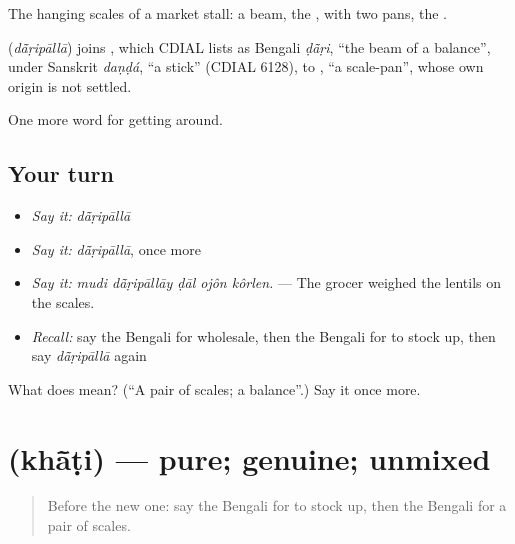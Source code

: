 The hanging scales of a market stall: a beam, the , with two pans, the .

\begin{cousinweb}
\textbf{} (\emph{dā̃ṛipāllā}) joins , which CDIAL lists as Bengali \emph{ḍā̃ṛi}, \textquotedblleft{}the beam of a balance\textquotedblright{}, under Sanskrit \emph{daṇḍá}, \textquotedblleft{}a stick\textquotedblright{} (CDIAL 6128), to , \textquotedblleft{}a scale-pan\textquotedblright{}, whose own origin is not settled.
\end{cousinweb}

\begin{grammarlens}[title={What you've built}]
One more word for getting around.
\end{grammarlens}

\subsection*{Your turn}
\begin{itemize}
\raggedright
  \item \emph{Say it:} \emph{dā̃ṛipāllā}
  \item \emph{Say it:} \emph{dā̃ṛipāllā}, once more
  \item \emph{Say it:} \emph{mudi dā̃ṛipāllāy ḍāl ojôn kôrlen.} — The grocer weighed the lentils on the scales.
  \item \emph{Recall:} say the Bengali for wholesale, then the Bengali for to stock up, then say \emph{dā̃ṛipāllā} again
\end{itemize}

\begin{tcolorbox}[breakable,colback=teal!4,colframe=teal!35!black,title={Before you move on}]
What does  mean? (\textquotedblleft{}A pair of scales; a balance\textquotedblright{}.) Say it once more.
\end{tcolorbox}
\section[\texorpdfstring{\bn{খাঁটি} (khā̃ṭi)}{খাঁটি (khā̃ṭi)}]{ (khā̃ṭi) — pure; genuine; unmixed}

\label{lesson:BN-C422-khati}



\begin{quote}
Before the new one: say the Bengali for to stock up, then the Bengali for a pair of scales.
\end{quote}

